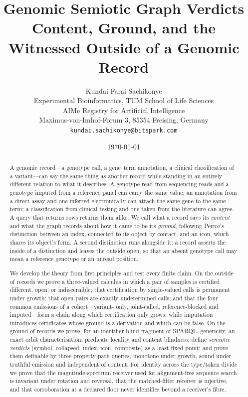 \documentclass[11pt,twocolumn,a4paper]{article}
\title{\textbf{Genomic Semiotic Graph Verdicts}\\[0.3em]
\large Content, Ground, and the Witnessed Outside of a Genomic Record}
\author{%
Kundai Farai Sachikonye\\[0.3em]
\normalsize Experimental Bioinformatics, TUM School of Life Sciences\\
\normalsize AIMe Registry for Artificial Intelligence\\
\normalsize Maximus-von-Imhof-Forum 3, 85354 Freising, Germany\\
\normalsize \texttt{kundai.sachikonye@bitspark.com}}
\date{\today}
\theoremstyle{plain}
\theoremstyle{definition}
\theoremstyle{remark}
\newcommand{\vsym}{\textsf{symbol}}
\newcommand{\vcol}{\textsf{collapsed}}
\newcommand{\vind}{\textsf{index}}
\newcommand{\vico}{\textsf{icon}}
\newcommand{\vcom}{\textsf{composite}}
\begin{document}
\maketitle

\begin{abstract}
\noindent
A genomic record---a genotype call, a gene--term annotation, a clinical
classification of a variant---can say the same thing as another record while
standing in an entirely different relation to what it describes. A genotype
read from sequencing reads and a genotype imputed from a reference panel can
carry the same value; an annotation from a direct assay and one inferred
electronically can attach the same gene to the same term; a classification
from clinical testing and one taken from the literature can agree. A query
that returns rows returns them alike. We call what a record says its
\emph{content} and what the graph records about how it came to be its
\emph{ground}, following Peirce's distinction between an index, connected to
its object by contact, and an icon, which shares its object's form. A second
distinction runs alongside it: a record asserts the inside of a distinction
and leaves the outside open, so that an absent genotype call may mean a
reference genotype or an unread position.

We develop the theory from first principles and test every finite claim. On
the outside of records we prove a three-valued calculus in which a pair of
samples is certified different, open, or indiscernible; that certification by
single-valued calls is permanent under growth; that open pairs are exactly
undetermined calls; and that the four common emissions of a cohort---variant-%
only, joint-called, reference-blocked and imputed---form a chain along which
certification only grows, while imputation introduces certificates whose ground
is a derivation and which can be false. On the ground of records we prove,
for an identifier-blind fragment of SPARQL, genericity, an exact orbit
characterisation, predicate locality and content blindness; define
\emph{semiotic verdicts} (\vsym, \vcol, \vind, \vico, \vcom) as a least fixed
point; and prove them definable by three property-path queries, monotone under
growth, sound under truthful emission and independent of content. For identity
across the type/token divide we prove that the magnitude-spectrum receiver used
for alignment-free sequence search is invariant under rotation and reversal,
that the matched-filter receiver is injective, and that corroboration at a
declared floor never identifies beyond a receiver's fibre.


\end{abstract}
\end{document}
